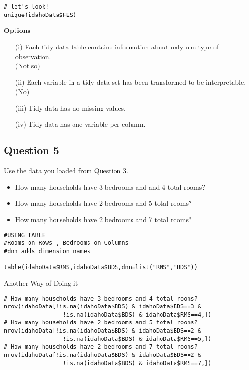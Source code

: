 \documentclass[]{article}
\begin{document}
\begin{framed} 
\begin{verbatim}
# let's look!
unique(idahoData$FES)
\end{verbatim}
\end{framed} 
\textbf{Options}
\begin{itemize}
\item[(i)]  Each tidy data table contains information about only one type of observation.\\
(Not so)

\item[(ii)]  Each variable in a tidy data set has been transformed to be interpretable.
(No)

\item[(iii)]  Tidy data has no missing values.

\item[(iv)]  Tidy data has one variable per column.
\end{itemize}
  
\newpage
\subsection*{ Question 5 }

Use the data you loaded from Question 3. 

\begin{itemize}
\item How many households have 3 bedrooms and and 4 total rooms? 
\item How many households have 2 bedrooms and 5 total rooms? 
\item How many households have 2 bedrooms and 7 total rooms?
\end{itemize}
\begin{framed}
\begin{verbatim}
#USING TABLE
#Rooms on Rows , Bedrooms on Columns
#dnn adds dimension names

table(idahoData$RMS,idahoData$BDS,dnn=list("RMS","BDS"))

\end{verbatim}
\end{framed}
Another Way of Doing it
\begin{framed}
\begin{verbatim}
# How many households have 3 bedrooms and 4 total rooms?
nrow(idahoData[!is.na(idahoData$BDS) & idahoData$BDS==3 &
                 !is.na(idahoData$BDS) & idahoData$RMS==4,])
# How many households have 2 bedrooms and 5 total rooms?
nrow(idahoData[!is.na(idahoData$BDS) & idahoData$BDS==2 &
                 !is.na(idahoData$BDS) & idahoData$RMS==5,])
# How many households have 2 bedrooms and 7 total rooms?
nrow(idahoData[!is.na(idahoData$BDS) & idahoData$BDS==2 &
                 !is.na(idahoData$BDS) & idahoData$RMS==7,])

\end{verbatim}
\end{framed}
\end{document}

